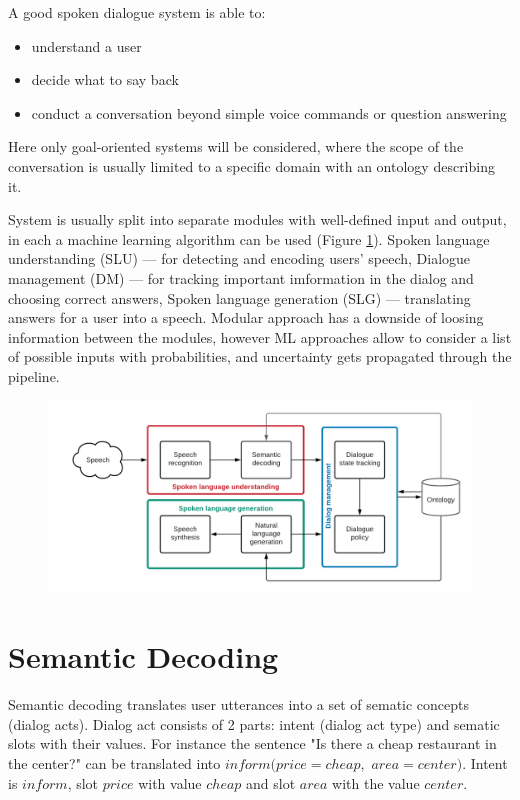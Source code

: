 \documentclass[12pt,titlepage,a4paper]{article}
\begin{document}
A good spoken dialogue system is able to:
\begin{itemize}
     \item understand a user
     \item decide what to say back
     \item conduct a conversation beyond simple voice commands or question answering
\end{itemize}

Here only goal-oriented systems will be considered, where the scope of the conversation is usually limited to a specific domain with an ontology describing it.

System is usually split into separate modules with well-defined input and output, in each a machine learning algo\-rithm can be used (Figure \ref{fig:SDS-main}). Spoken language understanding (SLU) --- for detecting and encoding users' speech, Dialogue manage\-ment (DM) --- for tracking important imformation in the dialog and choosing correct answers, Spoken language gene\-ration (SLG) --- translating answers for a user into a speech. Modular approach has a downside of loosing information bet\-ween the modules, however ML approaches allow to consider a list of possible inputs with probabilities, and uncertainty gets propagated through the pipeline.

\begin{figure}[!h]
    \includegraphics[width=\linewidth]{SDS-main.png}
    \caption{}
    \label{fig:SDS-main}
\end{figure}


\pagebreak
\section{Semantic Decoding}
Semantic decoding translates user utterances into a set of sematic concepts (dia\-log acts). Dialog act consists of 2 parts: intent (dialog act type) and sematic slots with their values. For instance the sentence "Is there a cheap restaurant in the center?" can be translated into $inform(price=cheap,$ $area$$=center)$. Intent is $inform$, slot $price$ with value $cheap$ and slot $area$ with the value $center$.
\end{document}
